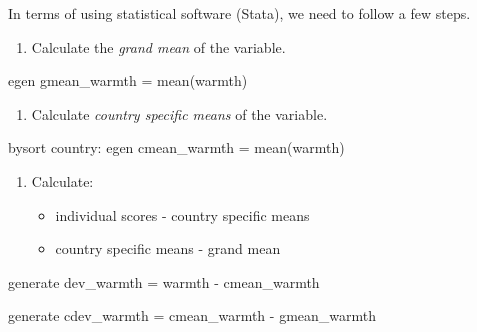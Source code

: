 \documentclass[
  letterpaper,
  DIV=11,
  numbers=noendperiod]{scrreprt}
\newenvironment{Shaded}{\begin{snugshade}}{\end{snugshade}}
\newcommand{\KeywordTok}[1]{\textcolor[rgb]{0.00,0.23,0.31}{#1}}
\newcommand{\NormalTok}[1]{\textcolor[rgb]{0.00,0.23,0.31}{#1}}
\providecommand{\tightlist}{%
  \setlength{\itemsep}{0pt}\setlength{\parskip}{0pt}}\usepackage{longtable,booktabs,array}
\begin{document}
In terms of using statistical software (Stata), we need to follow a few
steps.

\begin{enumerate}
\def\labelenumi{\arabic{enumi}.}
\tightlist
\item
  Calculate the \emph{grand mean} of the variable.
\end{enumerate}

\begin{Shaded}
\begin{Highlighting}[]

\KeywordTok{egen}\NormalTok{ gmean\_warmth = }\KeywordTok{mean}\NormalTok{(warmth)}
\end{Highlighting}
\end{Shaded}

\begin{enumerate}
\def\labelenumi{\arabic{enumi}.}
\setcounter{enumi}{1}
\tightlist
\item
  Calculate \emph{country specific means} of the variable.
\end{enumerate}

\begin{Shaded}
\begin{Highlighting}[]

\KeywordTok{bysort}\NormalTok{ country: }\KeywordTok{egen}\NormalTok{ cmean\_warmth = }\KeywordTok{mean}\NormalTok{(warmth)}
\end{Highlighting}
\end{Shaded}

\begin{enumerate}
\def\labelenumi{\arabic{enumi}.}
\setcounter{enumi}{2}
\tightlist
\item
  Calculate:

  \begin{itemize}
  \tightlist
  \item
    individual scores - country specific means
  \item
    country specific means - grand mean
  \end{itemize}
\end{enumerate}

\begin{Shaded}
\begin{Highlighting}[]

\KeywordTok{generate}\NormalTok{ dev\_warmth = warmth {-} cmean\_warmth}

\KeywordTok{generate}\NormalTok{ cdev\_warmth = cmean\_warmth {-} gmean\_warmth}
\end{Highlighting}
\end{Shaded}
\end{document}

